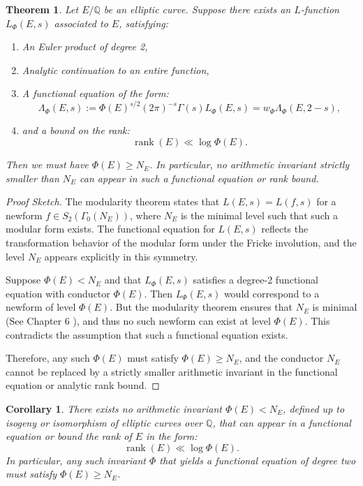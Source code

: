 \documentclass[a4paper,11pt]{article}
\newtheorem{corollary}{Corollary}
\theoremstyle{thmstyleone}%
\newtheorem{theorem}{Theorem}%
\theoremstyle{thmstyletwo}%
\theoremstyle{thmstylethree}%
\begin{document}
	\begin{theorem}
		Let \( E/\mathbb{Q} \) be an elliptic curve. Suppose there exists an \( L \)-function \( L_{\Phi}(E, s) \) associated to \( E \), satisfying:
		\begin{enumerate}
			\item An Euler product of degree 2,
			\item Analytic continuation to an entire function,
			\item A functional equation of the form:
			\[
			\Lambda_{\Phi}(E, s) := \Phi(E)^{s/2} (2\pi)^{-s} \Gamma(s) L_{\Phi}(E, s) = w_\Phi \Lambda_{\Phi}(E, 2 - s),
			\]
			\item and a bound on the rank:
			\[
			\operatorname{rank}(E) \ll \log \Phi(E).
			\]
		\end{enumerate}
		Then we must have \( \Phi(E) \ge N_E \). In particular, no arithmetic invariant strictly smaller than \( N_E \) can appear in such a functional equation or rank bound.
	\end{theorem}
	
	\begin{proof}[Proof Sketch]
		The modularity theorem states that \( L(E, s) = L(f, s) \) for a newform \( f \in S_2(\Gamma_0(N_E)) \), where \( N_E \) is the minimal level such that such a modular form exists. The functional equation for \( L(E, s) \) reflects the transformation behavior of the modular form under the Fricke involution, and the level \( N_E \) appears explicitly in this symmetry.
		
		Suppose \( \Phi(E) < N_E \) and that \( L_{\Phi}(E, s) \) satisfies a degree-2 functional equation with conductor \( \Phi(E) \). Then \( L_{\Phi}(E, s) \) would correspond to a newform of level \( \Phi(E) \). But the modularity theorem ensures that \( N_E \) is minimal (See Chapter 6 \cite{stein2007modular}), and thus no such newform can exist at level \( \Phi(E) \). This contradicts the assumption that such a functional equation exists.
		
		Therefore, any such \( \Phi(E) \) must satisfy \( \Phi(E) \ge N_E \), and the conductor \( N_E \) cannot be replaced by a strictly smaller arithmetic invariant in the functional equation or analytic rank bound.
	\end{proof}
	
	\begin{corollary}
		There exists no arithmetic invariant \( \Phi(E) < N_E \), defined up to isogeny or isomorphism of elliptic curves over \( \mathbb{Q} \), that can appear in a functional equation or bound the rank of \( E \) in the form:
		\[
		\operatorname{rank}(E) \ll \log \Phi(E).
		\]
		In particular, any such invariant \( \Phi \) that yields a functional equation of degree two must satisfy \( \Phi(E) \ge N_E \).
	\end{corollary}
	
\end{document}
